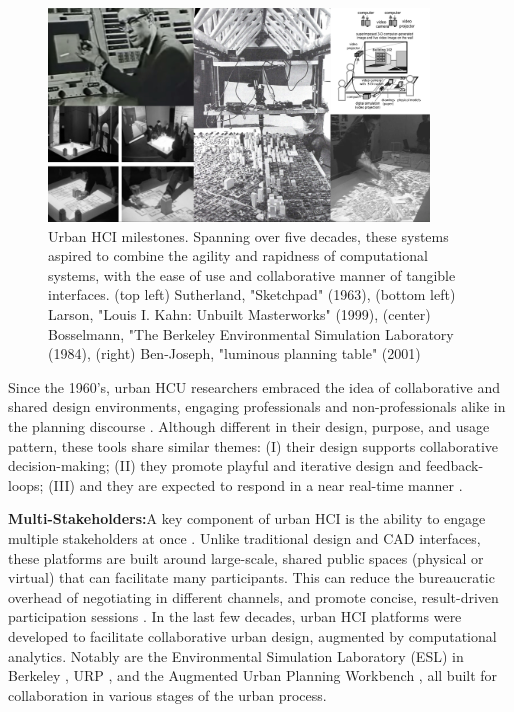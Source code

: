 \begin{figure}[t]
\begin{center}
    \includegraphics[width=0.9\textwidth]{figures/urbanHCI.jpg}
\end{center}
   \caption{Urban HCI milestones. Spanning over five decades, these systems aspired to combine the agility and rapidness of computational systems, with the ease of use and collaborative manner of tangible interfaces.    
   (top left) Sutherland, "Sketchpad" (1963),
   (bottom left)  Larson, "Louis I. Kahn: Unbuilt Masterworks" (1999),
   (center) Bosselmann, "The Berkeley Environmental Simulation Laboratory (1984),
   (right) Ben-Joseph, "luminous planning table" (2001)
   }
\label{fig:urbanHCI}
\end{figure}

{Since the 1960's, urban HCU researchers embraced the idea of collaborative and shared design environments, engaging professionals and non-professionals alike in the planning discourse \cite{Ben-Joseph2004, Ishii2008}. Although different in their design, purpose, and usage pattern, these tools share similar themes: (I) their design supports collaborative decision-making; (II) they promote playful and iterative design and feedback-loops; (III) and they are expected to respond in a near real-time manner \cite{Ullmer2010, Ben-Joseph2001, Snyder2003, mueller2018citizen}.}


\textbf{Multi-Stakeholders:}{A key component of urban HCI is the ability to engage multiple stakeholders at once \cite{Ben-Joseph2004}. Unlike traditional design and CAD interfaces, these platforms are built around large-scale, shared public spaces (physical or virtual) that can facilitate many participants. This can reduce the bureaucratic overhead of negotiating in different channels, and promote concise, result-driven participation sessions \cite{Ben-Joseph2001}. In the last few decades, urban HCI platforms were developed to facilitate collaborative urban design, augmented by computational analytics. Notably are the Environmental Simulation Laboratory (ESL) in Berkeley \cite{bosselmann1984berkeley}, URP \cite{underkoffler1999urp}, and the Augmented Urban Planning Workbench \cite{Ben-Joseph2004}, all built for collaboration in various stages of the urban process.}

